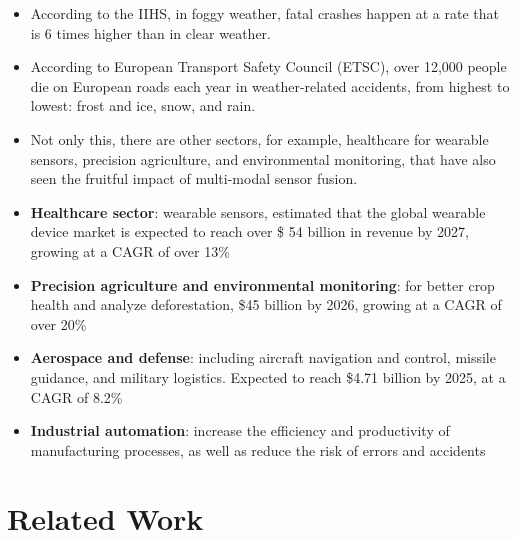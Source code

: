 \documentclass[rnd]{mas_proposal}
\begin{document}
\begin{itemize}
    \item According to the IIHS, in foggy weather, fatal crashes happen at a rate that is 6 times higher than in clear weather.
    
    \item According to European Transport Safety Council (ETSC), over 12,000 people die on European roads each year in weather-related accidents, from highest to lowest: frost and ice, snow, and rain.
    
    \item Not only this, there are other sectors, for example, healthcare for wearable sensors, precision agriculture, and environmental monitoring, that have also seen the fruitful impact of multi-modal sensor fusion.

    \item \textbf{Healthcare sector}: wearable sensors, estimated that the global wearable device market is expected to reach over \$ 54 billion in revenue by 2027, growing at a CAGR of over 13\%
    
    \item \textbf{Precision agriculture and  environmental monitoring}: for better crop health and analyze deforestation, \$45 billion by 2026, growing at a CAGR of over 20\% 
    
    \item \textbf{Aerospace and defense}: including aircraft navigation and control, missile guidance, and military logistics. Expected to reach \$4.71 billion by 2025, at a CAGR of 8.2\%    

    \item \textbf{Industrial automation}:  increase the efficiency and productivity of manufacturing processes, as well as reduce the risk of errors and accidents
    

    
 \end{itemize}

\section{Related Work}
\end{document}
